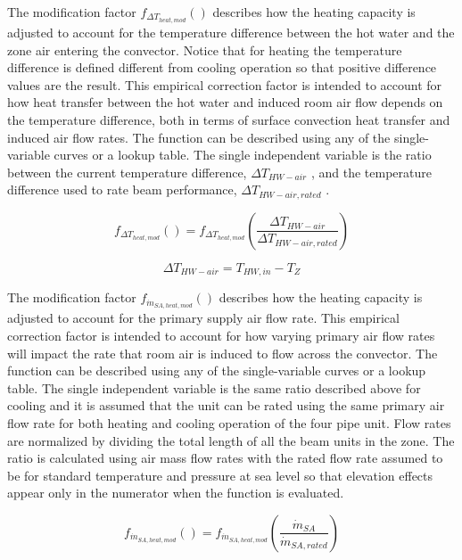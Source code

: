 The modification factor \(f_{ \Delta T_{heat,mod} }()\) describes how the heating capacity is adjusted to account for the temperature difference between the hot water and the zone air entering the convector. Notice that for heating the temperature difference is defined different from cooling operation so that positive difference values are the result. This empirical correction factor is intended to account for how heat transfer between the hot water and induced room air flow depends on the temperature difference, both in terms of surface convection heat transfer and induced air flow rates. The function can be described using any of the single-variable curves or a lookup table. The single independent variable is the ratio between the current temperature difference, \(\Delta T_{HW-air}\) , and the temperature difference used to rate beam performance, \(\Delta T_{HW-air,rated}\) .

\begin{equation}
{f_{ \Delta T_{heat,mod} }()} = f_{ \Delta T_{heat,mod} }\left(\frac{\Delta T_{HW-air}}{\Delta T_{HW-air,rated}}\right)
\end{equation}

\begin{equation}
{\Delta T_{HW-air}} = {T_{HW,in}} -{T_{Z}}
\end{equation}

The modification factor \(f_{\dot m_{SA,heat,mod}}()\) describes how the heating capacity is adjusted to account for the primary supply air flow rate. This empirical correction factor is intended to account for how varying primary air flow rates will impact the rate that room air is induced to flow across the convector. The function can be described using any of the single-variable curves or a lookup table. The single independent variable is the same ratio described above for cooling and it is assumed that the unit can be rated using the same primary air flow rate for both heating and cooling operation of the four pipe unit. Flow rates are normalized by dividing the total length of all the beam units in the zone. The ratio is calculated using air mass flow rates with the rated flow rate assumed to be for standard temperature and pressure at sea level so that elevation effects appear only in the numerator when the function is evaluated.

\begin{equation}
{f_{\dot m_{SA,heat,mod}}()} = f_{\dot m_{SA,heat,mod}}\left(\frac{{\dot m_{SA}}}{{\dot m_{SA,rated}} }\right)
\end{equation}

